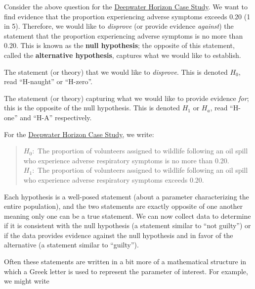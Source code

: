 \documentclass[]{book}
\theoremstyle{definition}
\theoremstyle{definition}
\theoremstyle{definition}
\theoremstyle{remark}
\let\BeginKnitrBlock\begin \let\EndKnitrBlock\end
\begin{document}
Consider the above question for the
\protect\hyperlink{CaseDeepwater}{Deepwater Horizon Case Study}. We want
to find evidence that the proportion experiencing adverse symptoms
exceeds 0.20 (1 in 5). Therefore, we would like to \emph{disprove} (or
provide evidence \emph{against}) the statement that the proportion
experiencing adverse symptoms is no more than 0.20. This is known as the
\textbf{null hypothesis}; the opposite of this statement, called the
\textbf{alternative hypothesis}, captures what we would like to
establish.

\BeginKnitrBlock{definition}[Null Hypothesis]
\protect\hypertarget{def:defn-null-hypothesis}{}{\label{def:defn-null-hypothesis}
{} }The statement (or theory) that we
would like to \emph{disprove}. This is denoted \(H_0\), read
``H-naught'' or ``H-zero''.
\EndKnitrBlock{definition}

\BeginKnitrBlock{definition}[Alternative Hypothesis]
\protect\hypertarget{def:defn-alternative-hypothesis}{}{\label{def:defn-alternative-hypothesis}
{} }The statement (or theory)
capturing what we would like to provide evidence \emph{for}; this is the
opposite of the null hypothesis. This is denoted \(H_1\) or \(H_a\),
read ``H-one'' and ``H-A'' respectively.
\EndKnitrBlock{definition}

For the \protect\hyperlink{CaseDeepwater}{Deepwater Horizon Case Study},
we write:

\begin{quote}
\(H_0:\) The proportion of volunteers assigned to wildlife following an
oil spill who experience adverse respiratory symptoms is no more than
0.20.\\
\(H_1:\) The proportion of volunteers assigned to wildlife following an
oil spill who experience adverse respiratory symptoms exceeds 0.20.
\end{quote}

Each hypothesis is a well-posed statement (about a parameter
characterizing the entire population), and the two statements are
exactly opposite of one another meaning only one can be a true
statement. We can now collect data to determine if it is consistent with
the null hypothesis (a statement similar to ``not guilty'') or if the
data provides evidence against the null hypothesis and in favor of the
alternative (a statement similar to ``guilty'').

Often these statements are written in a bit more of a mathematical
structure in which a Greek letter is used to represent the parameter of
interest. For example, we might write
\end{document}
